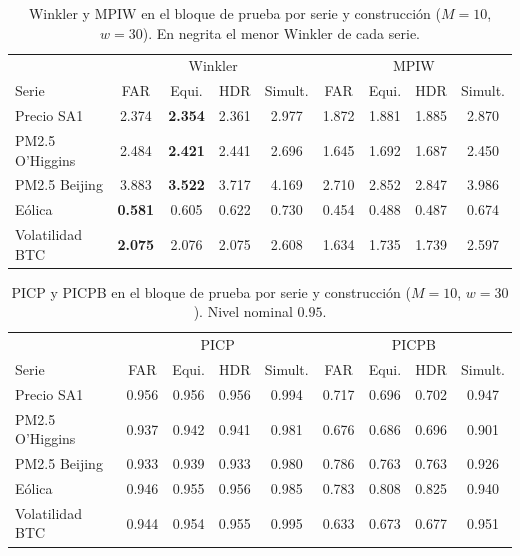 \begin{table}[H]
\centering\small
\setlength{\tabcolsep}{3.5pt}
\caption{Winkler y MPIW en el bloque de prueba por serie y construcción ($M = 10$, $w = 30$). En negrita el menor Winkler de cada serie.}
\label{tab:aneD_bloqueB_winkler}
\begin{tabular}{l cccc cccc}
\hline
 & \multicolumn{4}{c}{Winkler} & \multicolumn{4}{c}{MPIW} \\
Serie & FAR & Equi. & HDR & Simult. & FAR & Equi. & HDR & Simult. \\
\hline
Precio SA1 & 2.374 & \textbf{2.354} & 2.361 & 2.977 & 1.872 & 1.881 & 1.885 & 2.870 \\
PM2.5 O'Higgins & 2.484 & \textbf{2.421} & 2.441 & 2.696 & 1.645 & 1.692 & 1.687 & 2.450 \\
PM2.5 Beijing & 3.883 & \textbf{3.522} & 3.717 & 4.169 & 2.710 & 2.852 & 2.847 & 3.986 \\
Eólica & \textbf{0.581} & 0.605 & 0.622 & 0.730 & 0.454 & 0.488 & 0.487 & 0.674 \\
Volatilidad BTC & \textbf{2.075} & 2.076 & 2.075 & 2.608 & 1.634 & 1.735 & 1.739 & 2.597 \\
\hline
\end{tabular}
\end{table}

\begin{table}[H]
\centering\small
\setlength{\tabcolsep}{3.5pt}
\caption{PICP y PICPB en el bloque de prueba por serie y construcción ($M = 10$, $w = 30$). Nivel nominal $0.95$.}
\label{tab:aneD_bloqueB_picp}
\begin{tabular}{l cccc cccc}
\hline
 & \multicolumn{4}{c}{PICP} & \multicolumn{4}{c}{PICPB} \\
Serie & FAR & Equi. & HDR & Simult. & FAR & Equi. & HDR & Simult. \\
\hline
Precio SA1 & 0.956 & 0.956 & 0.956 & 0.994 & 0.717 & 0.696 & 0.702 & 0.947 \\
PM2.5 O'Higgins & 0.937 & 0.942 & 0.941 & 0.981 & 0.676 & 0.686 & 0.696 & 0.901 \\
PM2.5 Beijing & 0.933 & 0.939 & 0.933 & 0.980 & 0.786 & 0.763 & 0.763 & 0.926 \\
Eólica & 0.946 & 0.955 & 0.956 & 0.985 & 0.783 & 0.808 & 0.825 & 0.940 \\
Volatilidad BTC & 0.944 & 0.954 & 0.955 & 0.995 & 0.633 & 0.673 & 0.677 & 0.951 \\
\hline
\end{tabular}
\end{table}

